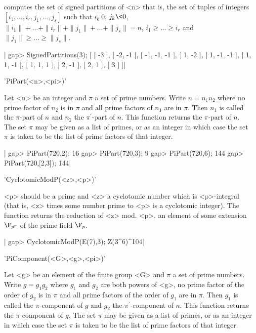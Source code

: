 computes  the set of signed partitions of <n> that is, the set of tuples of
integers  $[i_1,\ldots,i_r,j_1,\ldots,j_s]$ such  that $i_k  \> 0$, $j_k \<
0$,  $\|i_1\| + \ldots + \|i_r\| + \|j_1\| + \ldots + \|j_s\|= n$, $i_1 \ge
\ldots \ge i_r$ and $\|j_1\| \ge \ldots \ge \|j_s\|$.

|    gap> SignedPartitions(3);
    [ [ -3 ], [ -2, -1 ], [ -1, -1, -1 ], [ 1, -2 ], [ 1, -1, -1 ],
      [ 1, 1, -1 ], [ 1, 1, 1 ], [ 2, -1 ], [ 2, 1 ], [ 3 ] ]|

'PiPart(<n>,<pi>)'

Let  <n> be an integer  and $\pi$ a set  of prime numbers. Write $n=n_1n_2$
where  no prime factor of $n_2$ is in  $\pi$ and all prime factors of $n_1$
are  in $\pi$.  Then $n_1$  is called  the $\pi$-part  of $n$ and $n_2$ the
$\pi^\prime$-part  of $n$. This function returns the $\pi$-part of $n$. The
set  $\pi$ may be given as a list of primes, or as an integer in which case
the set $\pi$ is taken to be the list of prime factors of that integer.

|    gap> PiPart(720,2);
    16
    gap> PiPart(720,3);
    9
    gap> PiPart(720,6);
    144
    gap> PiPart(720,[2,3]);
    144|

'CyclotomicModP(<z>,<p>)'

<p>  should be a  prime and <z>  a cyclotomic number  which is <p>-integral
(that  is, <z> times some number prime to <p> is a cyclotomic integer). The
function  returns  the  reduction  of  <z>  mod.  <p>,  an  element of some
extension $\F_{p^r}$ of the prime field $\F_p$.

|    gap> CyclotomicModP(E(7),3);
    Z(3^6)^104|

'PiComponent(<G>,<g>,<pi>)'

Let  <g> be an  element of the  finite group <G>  and $\pi$ a  set of prime
numbers.  Write $g=g_1g_2$ where $g_1$ and $g_2$ are both powers of <g>, no
prime factor of the order of $g_2$ is in $\pi$ and all prime factors of the
order  of $g_1$ are in  $\pi$. Then $g_1$ is  called the $\pi$-component of
$g$  and $g_2$ the $\pi^\prime$-component of $n$. This function returns the
$\pi$-component  of $g$. The set $\pi$ may be given as a list of primes, or
as  an integer in which case the set $\pi$ is taken to be the list of prime
factors of that integer.

